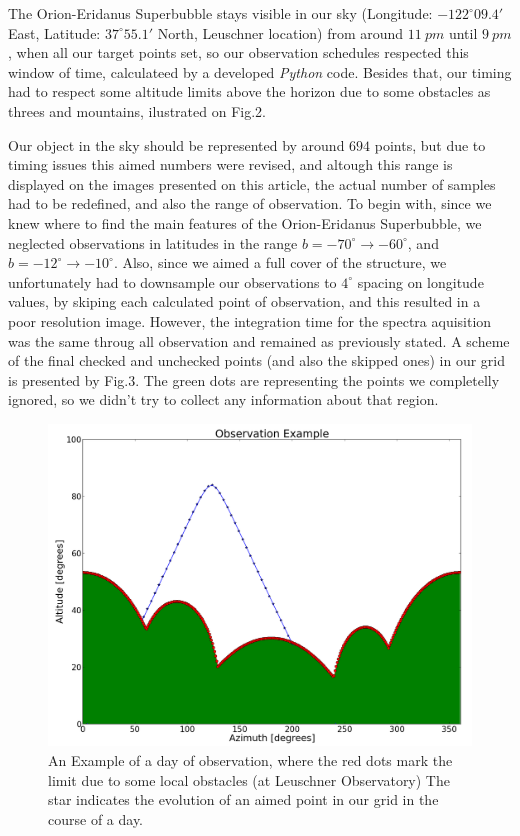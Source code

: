 \documentclass{article}
\begin{document}
The Orion-Eridanus Superbubble stays visible in our sky (Longitude: $-122^{\circ} 09.4'$ East,
Latitude: $37^{\circ} 55.1'$ North, Leuschner location) from around $11 \ pm$ until $9 \ pm$, when
all our target points set, so our observation schedules respected this window of time, calculateed
by a developed \emph{Python} code. Besides that, our timing had to respect some altitude limits 
above the horizon due to some obstacles as threes and mountains, ilustrated on Fig.2.

Our object in the sky should  be represented by around $694$ points,
but due to timing issues this aimed numbers were revised, and altough this range is displayed
on the images presented on this article, the actual number of samples had to be redefined, and
also the range of observation. To begin with, since we knew where to find the main features of 
the Orion-Eridanus Superbubble, we neglected observations in latitudes in the range $b = -70^{\circ}
\rightarrow -60^{\circ}$, and $b = -12^{\circ} \rightarrow -10^{\circ}$. Also, since we aimed a full cover of 
the structure, we unfortunately had to downsample our observations to $4 ^{\circ}$ spacing on longitude 
values, by skiping each calculated point of observation, and this resulted in a poor resolution image. 
However, the integration time for the spectra aquisition was the same throug all observation and 
remained as previously stated. A scheme of the final checked and unchecked points (and also the skipped ones) 
in our grid is presented by Fig.3. The green dots are representing the points we 
completelly ignored, so we didn't try to collect any information about that region.

\begin{figure}[H]
\center
\includegraphics[scale=0.41]{mount.png}
\caption {An Example of a day of observation, where the red dots mark the limit due to some local obstacles
(at Leuschner Observatory) The star indicates the evolution of an aimed point in our grid in the course
of a day.} 
\label{mountain}
\end{figure}
\end{document}
